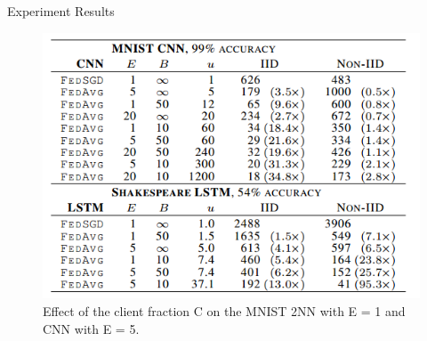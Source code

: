\documentclass{beamer}
\begin{document}
\begin{frame}{Experiment Results}
	\begin{figure}[htbp]
		\centering
		\includegraphics[scale=0.7]{table2.png}
		\caption{Effect of the client fraction C on the MNIST 2NN
			with E = 1 and CNN with E = 5.}
	\end{figure}
\end{frame}
\end{document}
